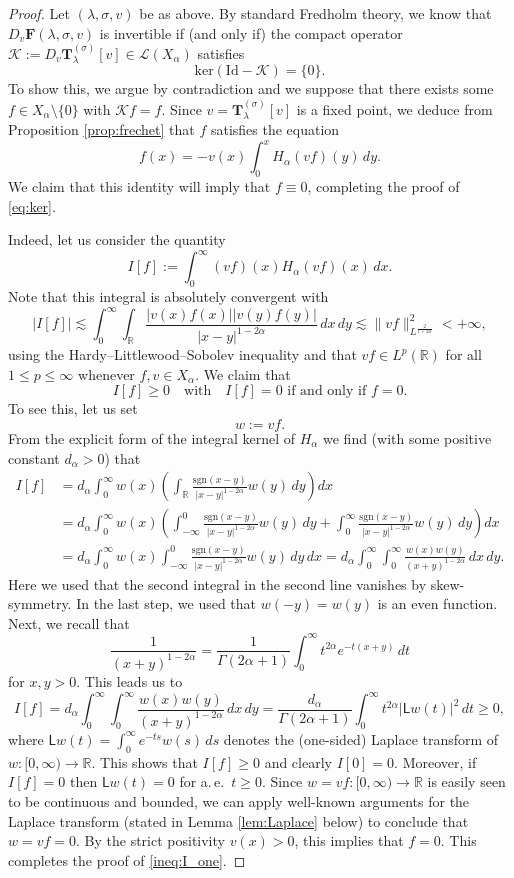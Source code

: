 \documentclass[reqno,10pt,a4paper]{amsart}
\theoremstyle{definition}
\theoremstyle{definition}
\theoremstyle{remark}
\theoremstyle{remark}
\numberwithin{equation}{section}
\newcommand{\R}{\mathbb{R}}
\renewcommand{\ker}{\mathrm{ker}}
\newcommand{\be}{\begin{equation}}
\newcommand{\ee}{\end{equation}}
\newcommand{\KK}{\mathcal{K}}
\newcommand{\sgn}{\mathrm{sgn}}
\newcommand{\id}{\mathrm{Id}}
\newcommand{\Tss}{\mathbf{T}^{(\sigma)}_\lambda}
\newcommand{\Fs}{\mathbf{F}}
\begin{document}
\begin{proof}
Let $(\lambda, \sigma, v)$ be as above. By standard Fredholm theory, we know that $D_v \Fs(\lambda, \sigma, v)$ is invertible if (and only if) the compact operator $\KK := D_v \Tss[v] \in \mathcal{L}(X_\alpha)$ satisfies
\be \label{eq:ker}
\ker (\id - \KK ) = \{ 0 \}.
\ee
To show this, we argue by contradiction and we suppose that there exists some $f \in X_\alpha \setminus \{ 0 \}$ with  $\KK f = f$. Since $v = \Tss[v]$ is a fixed point, we deduce from Proposition \ref{prop:frechet} that $f$ satisfies the equation
\be \label{eq:f_eq}
f(x) = -v(x) \int_0^x H_\alpha(vf)(y) \, dy.
\ee
We claim that this identity will imply that $f \equiv 0$, completing the proof of \eqref{eq:ker}.

Indeed, let us consider the quantity
\be
I[f] := \int_0^\infty (vf)(x) H_\alpha(vf)(x) \, dx .
\ee
Note that this integral is absolutely convergent with
$$
|I[f]| \lesssim \int_0^\infty \int_{\R} \frac{|v(x)f(x)||v(y) f(y)|}{|x-y|^{1-2 \alpha}} \, dx \, dy \lesssim \| v f \|_{L^{\frac{2}{1+2 \alpha}}}^2 < +\infty,
$$
using the Hardy--Littlewood--Sobolev inequality and that $vf \in L^p(\R)$ for all $1 \leq p \leq \infty$ whenever $f,v \in X_\alpha$. We claim that 
\be \label{ineq:I_one}
I[f] \geq 0 \quad \mbox{with} \quad \mbox{$I[f]=0$ if and only if $f =0$}.
\ee 
To see this, let us set 
$$
w:= vf.
$$ 
From the explicit form of the integral kernel of $H_\alpha$ we find (with some positive constant $d_\alpha > 0$) that
\begin{align*}
I[f] & = d_\alpha \int_0^\infty w(x) \left ( \int_{\R} \frac{\sgn(x-y)}{|x-y|^{1-2 \alpha}} w(y) \, dy \right ) dx \\
& = d_\alpha \int_0^\infty w(x) \left ( \int_{-\infty}^0 \frac{\sgn(x-y)}{|x-y|^{1-2 \alpha}} w(y) \, dy + \int_0^\infty \frac{\sgn(x-y)}{|x-y|^{1-2 \alpha}} w(y) \, dy \right )  dx \\
& = d_\alpha \int_0^\infty w(x) \int_{-\infty}^0 \frac{\sgn(x-y)}{|x-y|^{1-2 \alpha}} w(y) \, dy \, dx = d_\alpha \int_0^\infty \int_0^\infty \frac{w(x) w(y)}{(x+y)^{1-2 \alpha}} \, dx \, dy.
\end{align*}
Here we used that the second integral in the second line vanishes by skew-symmetry. In the last step, we used that $w(-y) = w(y)$ is an even function. Next, we recall that
$$
\frac{1}{(x+y)^{1-2 \alpha}} = \frac{1}{\Gamma(2 \alpha+1)} \int_0^\infty t^{2 \alpha} e^{-t(x+y)} \, dt
$$
for $x,y >0$. This leads us to
$$
I[f] = d_\alpha \int_0^\infty \int_0^\infty \frac{w(x) w(y)}{(x+y)^{1-2 \alpha}} \, dx \, dy = \frac{d_\alpha}{\Gamma(2 \alpha +1)} \int_0^\infty t^{2 \alpha} |\mathsf{L}w(t)|^2 \, dt \geq 0,
$$
where $\mathsf{L} w(t) = \int_0^\infty e^{-t s} w(s) \, ds$ denotes the (one-sided) Laplace transform of $w : [0,\infty) \to \R$. This shows that $I[f] \geq 0$ and clearly $I[0]=0$. Moreover, if $I[f]=0$ then $\mathsf{L}w(t)=0$ for a.\,e.~$t \geq 0$. Since $w=vf : [0,\infty) \to \R$ is easily seen to be continuous and bounded, we can apply well-known arguments for the Laplace transform (stated in Lemma \ref{lem:Laplace} below) to conclude that $w=vf=0$. By the strict positivity $v(x) > 0$, this implies that $f=0$.  This completes the proof of \eqref{ineq:I_one}. 


\end{proof}
\end{document}
